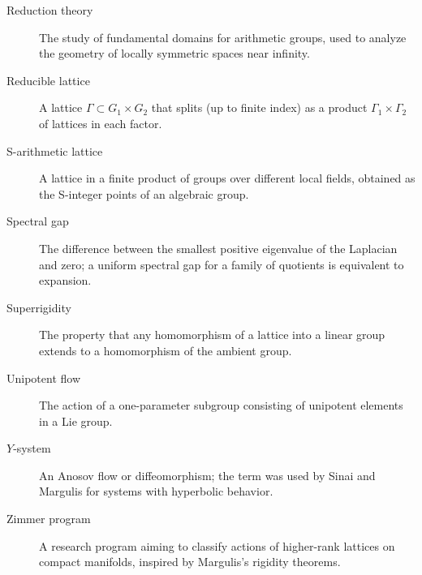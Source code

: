 \begin{description}
    \item[Reduction theory] The study of fundamental domains for arithmetic groups, used to analyze the geometry of locally symmetric spaces near infinity.
    \item[Reducible lattice] A lattice \(\Gamma \subset G_1 \times G_2\) that splits (up to finite index) as a product \(\Gamma_1 \times \Gamma_2\) of lattices in each factor.
    \item[S-arithmetic lattice] A lattice in a finite product of groups over different local fields, obtained as the S-integer points of an algebraic group.
    \item[Spectral gap] The difference between the smallest positive eigenvalue of the Laplacian and zero; a uniform spectral gap for a family of quotients is equivalent to expansion.
    \item[Superrigidity] The property that any homomorphism of a lattice into a linear group extends to a homomorphism of the ambient group.
    \item[Unipotent flow] The action of a one-parameter subgroup consisting of unipotent elements in a Lie group.
    \item[\(Y\)-system] An Anosov flow or diffeomorphism; the term was used by Sinai and Margulis for systems with hyperbolic behavior.
    \item[Zimmer program] A research program aiming to classify actions of higher-rank lattices on compact manifolds, inspired by Margulis's rigidity theorems.
\end{description}
